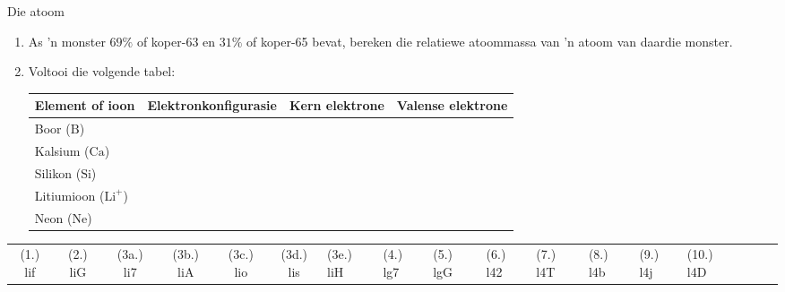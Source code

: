\begin{eocexercises}{Die atoom}
\begin{enumerate}[noitemsep, label=\textbf{\arabic*}. ]
\item As 'n monster $69\%$ of koper-63 en $31\%$ of koper-65 bevat, bereken die relatiewe atoommassa van 'n atoom van daardie monster.
            \item Voltooi die volgende tabel:
          \begin{table}[H]
        \begin{center}
      
    \noindent
      \begin{tabular}{|l|l|l|l|}\hline
        Element of ioon &
        Elektronkonfigurasie &
        Kern elektrone &
        Valense elektrone \\ \hline
        Boor ($\text{B}$) &
         &
         &
       \\ \hline
        Kalsium ($\text{Ca}$) &
         &
         &
     \\ \hline
        Silikon ($\text{Si}$) &
         &
         &
       \\ \hline
        Litiumioon ($\text{Li}^{+}$) &
         &
         &
      \\ \hline
        Neon ($\text{Ne}$) &
         &
         &
     \\ \hline
    \end{tabular}
      \end{center}
\end{table}
    \par
\end{enumerate}

\practiceinfo
\begin{tabular}[h]{cccccc}
 (1.) lif  &  (2.) liG  &  (3a.) li7  &  (3b.) liA  &  (3c.) lio  &  (3d.) lis  &  (3e.) liH  &  (4.) lg7  &  (5.) lgG  &  (6.) l42  &  (7.) l4T  &  (8.) l4b  &  (9.) l4j  &  (10.) l4D  &  & &  &
\end{tabular}

\end{eocexercises}
